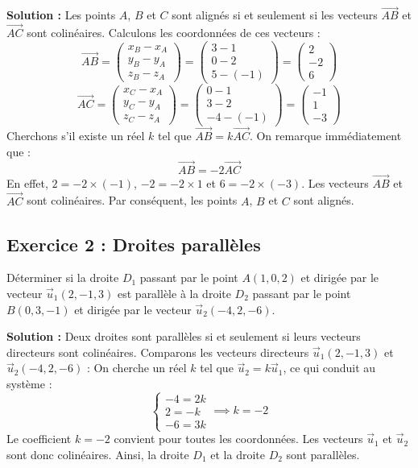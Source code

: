 \textbf{Solution :}
Les points $A$, $B$ et $C$ sont alignés si et seulement si les vecteurs $\vec{AB}$ et $\vec{AC}$ sont colinéaires.
Calculons les coordonnées de ces vecteurs :
\[
\vec{AB} = \begin{pmatrix} x_B - x_A \\ y_B - y_A \\ z_B - z_A \end{pmatrix} = \begin{pmatrix} 3 - 1 \\ 0 - 2 \\ 5 - (-1) \end{pmatrix} = \begin{pmatrix} 2 \\ -2 \\ 6 \end{pmatrix}
\]
\[
\vec{AC} = \begin{pmatrix} x_C - x_A \\ y_C - y_A \\ z_C - z_A \end{pmatrix} = \begin{pmatrix} 0 - 1 \\ 3 - 2 \\ -4 - (-1) \end{pmatrix} = \begin{pmatrix} -1 \\ 1 \\ -3 \end{pmatrix}
\]
Cherchons s'il existe un réel $k$ tel que $\vec{AB} = k \vec{AC}$. On remarque immédiatement que :
\[
\vec{AB} = -2 \vec{AC}
\]
En effet, $2 = -2 \times (-1)$, $-2 = -2 \times 1$ et $6 = -2 \times (-3)$.
Les vecteurs $\vec{AB}$ et $\vec{AC}$ sont colinéaires. Par conséquent, les points $A$, $B$ et $C$ sont alignés.

\subsection*{Exercice 2 : Droites parallèles}
Déterminer si la droite $D_1$ passant par le point $A(1, 0, 2)$ et dirigée par le vecteur $\vec{u}_1(2, -1, 3)$ est parallèle à la droite $D_2$ passant par le point $B(0, 3, -1)$ et dirigée par le vecteur $\vec{u}_2(-4, 2, -6)$.

\textbf{Solution :}
Deux droites sont parallèles si et seulement si leurs vecteurs directeurs sont colinéaires.
Comparons les vecteurs directeurs $\vec{u}_1(2, -1, 3)$ et $\vec{u}_2(-4, 2, -6)$ :
On cherche un réel $k$ tel que $\vec{u}_2 = k \vec{u}_1$, ce qui conduit au système :
\[
\begin{cases}
-4 = 2k \\
2 = -k \\
-6 = 3k
\end{cases} \implies k = -2
\]
Le coefficient $k = -2$ convient pour toutes les coordonnées. Les vecteurs $\vec{u}_1$ et $\vec{u}_2$ sont donc colinéaires.
Ainsi, la droite $D_1$ et la droite $D_2$ sont parallèles.

